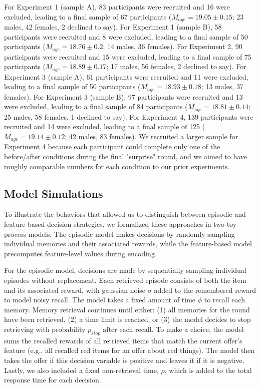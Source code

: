 \documentclass[10pt,letterpaper]{article}
\begin{document}
For Experiment 1 (sample A), 83 participants were recruited and 16 were excluded, leading to a final sample of 67 participants ($M_{age} = 19.05 \pm 0.15$; 23 males, 42 females, 2 declined to say). For Experiment 1 (sample B), 58 participants were recruited and 8 were excluded, leading to a final sample of 50 participants ($M_{age} = 18.76 \pm 0.2$; 14 males, 36 females). For Experiment 2, 90 participants were recruited and 15 were excluded, leading to a final sample of 75 participants ($M_{age} = 18.89 \pm 0.17$; 17 males, 56 females, 2 declined to say). For Experiment 3 (sample A), 61 participants were recruited and 11 were excluded, leading to a final sample of 50 participants ($M_{age} = 18.93 \pm 0.18$; 13 males, 37 females). For Experiment 3 (sample B), 97 participants were recruited and 13 were excluded, leading to a final sample of 84 participants ($M_{age} = 18.81 \pm 0.14$; 25 males, 58 females, 1 declined to say). For Experiment 4, 139 participants were recruited and 14 were excluded, leading to a final sample of 125 ($M_{age} = 19.14 \pm 0.12$; 42 males, 83 females). We recruited a larger sample for Experiment 4 because each participant could complete only one of the before/after conditions during the final "surprise" round, and we aimed to have roughly comparable numbers for each condition to our prior experiments.

\subsection{Model Simulations}

To illustrate the behaviors that allowed us to distinguish between episodic and feature-based decision strategies, we formalized these approaches in two toy process models. The episodic model makes decisions by randomly sampling individual memories and their associated rewards, while the feature-based model precomputes feature-level values during encoding.

For the episodic model, decisions are made by sequentially sampling individual episodes without replacement. Each retrieved episode consists of both the item and its associated reward, with gaussian noise $\sigma$ added to the remembered reward to model noisy recall. The model takes a fixed amount of time $\phi$ to recall each memory. Memory retrieval continues until either: (1) all memories for the round have been retrieved, (2) a time limit is reached, or (3) the model decides to stop retrieving with probability $p_{stop}$ after each recall. To make a choice, the model sums the recalled rewards of all retrieved items that match the current offer's feature (e.g., all recalled red items for an offer about red things). The model then takes the offer if this decision variable is positive and leaves it if it is negative. Lastly, we also included a fixed non-retrieval time, $\rho$, which is added to the total response time for each decision.
\end{document}
